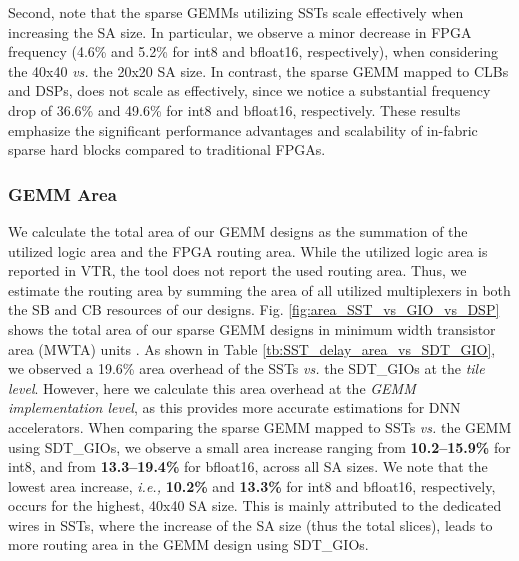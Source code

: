 Second, note that the sparse GEMMs utilizing SSTs scale effectively when increasing the SA size.
In particular, we observe a minor decrease in FPGA frequency (4.6\% and 5.2\% for int8 and bfloat16, respectively), when considering the 40x40 \emph{vs.} the 20x20 SA size.
In contrast, the sparse GEMM mapped to CLBs and DSPs, does not scale as effectively, since we notice a substantial frequency drop of 36.6\% and 49.6\% for int8 and bfloat16, respectively.
These results emphasize the significant performance advantages and scalability of in-fabric sparse hard blocks compared to traditional FPGAs.













\subsubsection{GEMM Area}

We calculate the total area of our GEMM designs as the summation of the utilized logic area and the FPGA routing area.
While the utilized logic area is reported in VTR, the tool  does not report the used routing area.
Thus, we estimate the routing area by summing the area of all utilized multiplexers in both the SB and CB resources of our designs.
Fig. \ref{fig:area_SST_vs_GIO_vs_DSP} shows the total area of our sparse GEMM designs in minimum width transistor area (MWTA) units \cite{VTR_8_2020}.
As shown in Table \ref{tb:SST_delay_area_vs_SDT_GIO}, we observed a 19.6\% area overhead of the SSTs \emph{vs.} the SDT\_GIOs at the \textit{tile level}.
However, here we calculate this area overhead at the \textit{GEMM implementation level}, as this provides more accurate estimations for DNN accelerators.
When comparing the sparse GEMM mapped to SSTs \emph{vs.} the GEMM using SDT\_GIOs, we observe a small area increase ranging from \textbf{10.2--15.9\%} for int8, and from \textbf{13.3--19.4\%} for bfloat16, across all SA sizes.
We note that the lowest area increase, \emph{i.e.,} \textbf{10.2\%} and \textbf{13.3\%} for int8 and bfloat16, respectively, occurs for the highest, 40x40 SA size.
This is mainly attributed to the dedicated wires in SSTs, where the increase of the SA size (thus the total slices), leads to more routing area in the GEMM design using SDT\_GIOs. 


